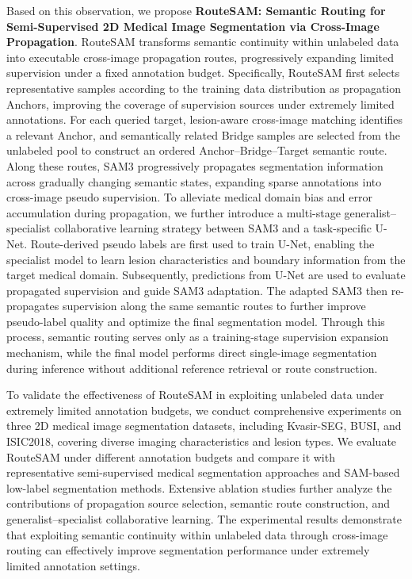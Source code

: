\documentclass[a4paper,fleqn]{cas-dc}
\begin{document}
Based on this observation, we propose 
\textbf{RouteSAM: Semantic Routing for Semi-Supervised 2D Medical Image Segmentation via Cross-Image Propagation}. 
RouteSAM transforms semantic continuity within unlabeled data into executable cross-image propagation routes, progressively expanding limited supervision under a fixed annotation budget. Specifically, RouteSAM first selects representative samples according to the training data distribution as propagation Anchors, improving the coverage of supervision sources under extremely limited annotations. For each queried target, lesion-aware cross-image matching identifies a relevant Anchor, and semantically related Bridge samples are selected from the unlabeled pool to construct an ordered Anchor--Bridge--Target semantic route. Along these routes, SAM3 progressively propagates segmentation information across gradually changing semantic states, expanding sparse annotations into cross-image pseudo supervision. To alleviate medical domain bias and error accumulation during propagation, we further introduce a multi-stage generalist--specialist collaborative learning strategy between SAM3 and a task-specific U-Net. Route-derived pseudo labels are first used to train U-Net, enabling the specialist model to learn lesion characteristics and boundary information from the target medical domain. Subsequently, predictions from U-Net are used to evaluate propagated supervision and guide SAM3 adaptation. The adapted SAM3 then re-propagates supervision along the same semantic routes to further improve pseudo-label quality and optimize the final segmentation model. Through this process, semantic routing serves only as a training-stage supervision expansion mechanism, while the final model performs direct single-image segmentation during inference without additional reference retrieval or route construction.


To validate the effectiveness of RouteSAM in exploiting unlabeled data under extremely limited annotation budgets, we conduct comprehensive experiments on three 2D medical image segmentation datasets, including Kvasir-SEG, BUSI, and ISIC2018, covering diverse imaging characteristics and lesion types. We evaluate RouteSAM under different annotation budgets and compare it with representative semi-supervised medical segmentation approaches and SAM-based low-label segmentation methods. Extensive ablation studies further analyze the contributions of propagation source selection, semantic route construction, and generalist--specialist collaborative learning. The experimental results demonstrate that exploiting semantic continuity within unlabeled data through cross-image routing can effectively improve segmentation performance under extremely limited annotation settings.
\end{document}
